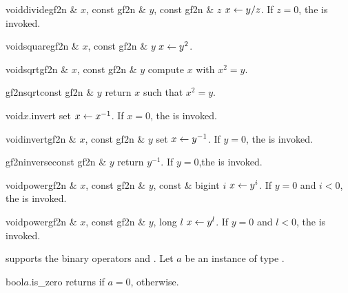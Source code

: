 \begin{fcode}{void}{divide}{gf2n & $x$, const gf2n & $y$, const gf2n & $z$}
  $x \leftarrow y / z$.  If $z = 0$, the \LEH is invoked.
\end{fcode}

\begin{fcode}{void}{square}{gf2n & $x$, const gf2n & $y$}
  $x \leftarrow y^2$.
\end{fcode}

\begin{fcode}{void}{sqrt}{gf2n & $x$, const gf2n & $y$}
  compute $x$ with $x^2 = y$.
\end{fcode}

\begin{fcode}{gf2n}{sqrt}{const gf2n & $y$}
  return $x$ such that $x^2 = y$.
\end{fcode}

\begin{fcode}{void}{$x$.invert}{}
  set $x \leftarrow x^{-1}$.  If $x = 0$, the \LEH is invoked.
\end{fcode}

\begin{fcode}{void}{invert}{gf2n & $x$, const gf2n & $y$}
  set $x \leftarrow y^{-1}$.  If $y = 0$, the \LEH is invoked.
\end{fcode}

\begin{fcode}{gf2n}{inverse}{const gf2n & $y$}
  return $y^{-1}$.  If $y = 0$,the \LEH is invoked.
\end{fcode}

\begin{fcode}{void}{power}{gf2n & $x$, const gf2n & $y$, const & bigint $i$}
  $x \leftarrow y^i$.  If $y = 0$ and $i < 0$, the \LEH is invoked.
\end{fcode}

\begin{fcode}{void}{power}{gf2n & $x$, const gf2n & $y$, long $l$}
  $x \leftarrow y^l$.  If $y = 0$ and $l < 0$, the \LEH is invoked.
\end{fcode}



\COMP

 supports the binary operators \code{==} and \code{!=}.  Let $a$ be an instance of type
.

\begin{cfcode}{bool}{$a$.is_zero}{}
  returns \TRUE if $a = 0$, \FALSE otherwise.
\end{cfcode}

